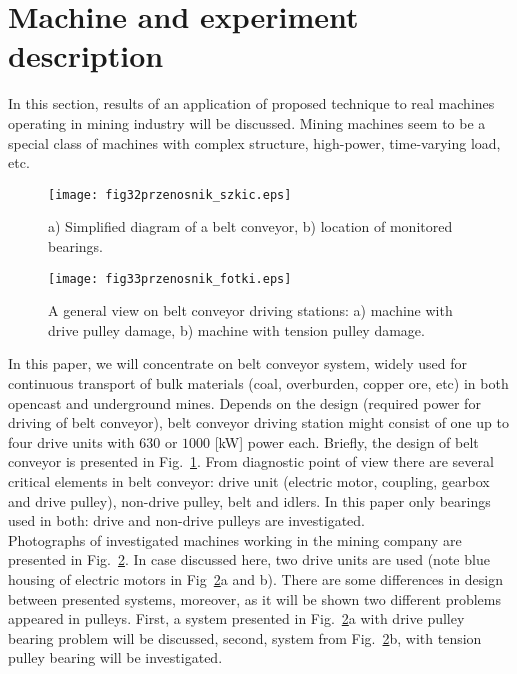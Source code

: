 \documentclass[3p,times]{elsarticle}
\begin{document}
\section{Machine and experiment description}\label{experiment}
In this section, results of an application of proposed technique to real machines operating in mining industry will be discussed. Mining machines seem to be a special class of machines with complex structure, high-power, time-varying load, etc.
\begin{figure}[!ht]
\begin{center}
\texttt{[image: fig32przenosnik\_szkic.eps]}
\caption{a) Simplified diagram of a belt conveyor, b) location of monitored bearings.}\label{fig1R}
\end{center}
\end{figure}
\begin{figure}[!ht]
\begin{center}
\texttt{[image: fig33przenosnik\_fotki.eps]}
\caption{A general view on belt conveyor driving stations: a) machine with drive pulley damage, b) machine with tension pulley damage.}\label{fig2R}
\end{center}
\end{figure}
In this paper, we will concentrate on belt conveyor system, widely used for continuous transport of bulk materials (coal, overburden, copper ore, etc) in both opencast and underground mines. Depends on the design (required power for driving of belt conveyor), belt conveyor driving station might consist of one up to four drive units with $630$ or $1000$ [kW] power each. Briefly, the design of belt conveyor is presented in Fig.~\ref{fig1R}.  From diagnostic point of view there are several critical elements in belt conveyor: drive unit (electric motor, coupling, gearbox and drive pulley), non-drive pulley, belt and idlers. In this paper only bearings used in both: drive and non-drive pulleys are investigated.\\
Photographs of investigated machines working in the mining company are presented in Fig.~\ref{fig2R}. In case discussed here, two drive units are used (note blue housing of electric motors in Fig~\ref{fig2R}a and b). There are some differences in design between presented systems, moreover, as it will be shown two different problems appeared in pulleys. First, a system presented in Fig.~\ref{fig2R}a with drive pulley bearing problem will be discussed, second, system from Fig.~\ref{fig2R}b, with tension pulley bearing will be investigated.\\
\end{document}
